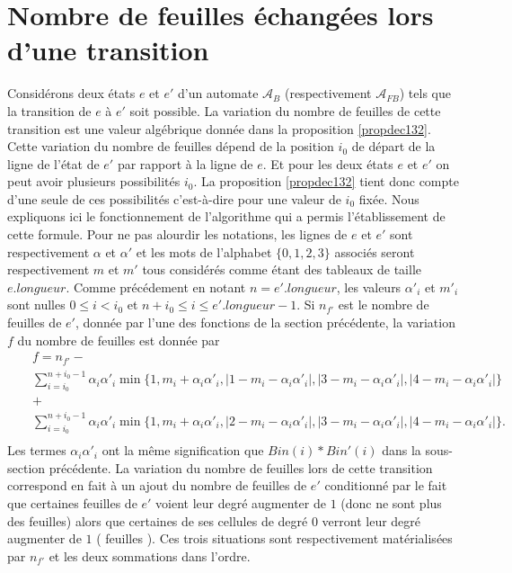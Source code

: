 \section{Nombre de feuilles échangées lors d'une transition}
Considérons deux états $e$ et $e'$ d'un automate  $\mathcal{A}_{B}$ (respectivement $\mathcal{A}_{FB}$) tels que la transition de $e$ à $e'$ soit possible. La variation du nombre de feuilles de cette transition est une valeur algébrique donnée dans la proposition \ref{propdec132}. Cette variation du nombre de feuilles dépend  de la position $i_{0}$ de départ de la ligne de l'état de $e'$ par rapport à la ligne de $e$. Et pour les deux états $e$ et $e'$ on peut avoir plusieurs possibilités $i_{0}$. La proposition \ref{propdec132} tient donc compte d'une seule de ces possibilités c'est-à-dire pour une valeur de $i_{0}$ fixée. Nous expliquons ici le fonctionnement de l'algorithme  qui a permis l'établissement de cette formule. Pour ne pas alourdir les notations, les lignes de $e$ et $e'$ sont respectivement $\alpha$ et $\alpha'$ et les mots de l'alphabet $\{0,1,2,3\}$ associés seront respectivement $m$ et $m'$ tous considérés comme étant des tableaux de  taille $e.longueur$. Comme précédement en notant $n= e'.longueur$, les valeurs $\alpha'_{i}$ et $m'_{i}$ sont nulles $0\leq i<i_{0}$ et $n+i_{0}\leq i \leq e'.longueur-1$. Si $n_{f'}$ est le nombre de feuilles de $e'$, donnée par l'une des fonctions de la section précédente, la variation $f$ du nombre de feuilles est donnée par 
\begin{eqnarray*}
& & f  =  n_{f'}-\\\nonumber
 & &\sum_{i=i_{0}}^{n+i_{0}-1}\alpha_{i}\alpha'_{i}\min\{1,m_{i} +\alpha_{i}\alpha'_{i},\vert 1-m_{i}-\alpha_{i}\alpha'_{i}\vert, \vert 3-m_{i}-\alpha_{i}\alpha'_{i}\vert,\vert 4-m_{i}-\alpha_{i}\alpha'_{i}\vert\}\nonumber\\
 & & +\nonumber\\\nonumber
 & &\sum_{i=i_{0}}^{n+i_{0}-1}\alpha_{i}\alpha'_{i}\min\{1,m_{i} +\alpha_{i}\alpha'_{i},\vert 2-m_{i}-\alpha_{i}\alpha'_{i}\vert, \vert 3-m_{i}-\alpha_{i}\alpha'_{i}\vert,\vert 4-m_{i}-\alpha_{i}\alpha'_{i}\vert\}.\\
 \end{eqnarray*} 
 Les termes $\alpha_{i}\alpha'_{i}$ ont la même signification que  $Bin(i)*Bin'(i)$ dans la sous-section précédente. La variation du nombre de feuilles lors de cette transition correspond en fait à un ajout du nombre de feuilles de $e'$ conditionné par le fait que certaines feuilles de $e'$ voient leur degré augmenter de $1$ (donc ne sont plus des feuilles) alors que certaines de ses cellules de degré $0$ verront leur degré augmenter de $1$ ( feuilles ). Ces trois situations sont respectivement matérialisées par $n_{f'}$ et les deux sommations dans l'ordre. 
 
